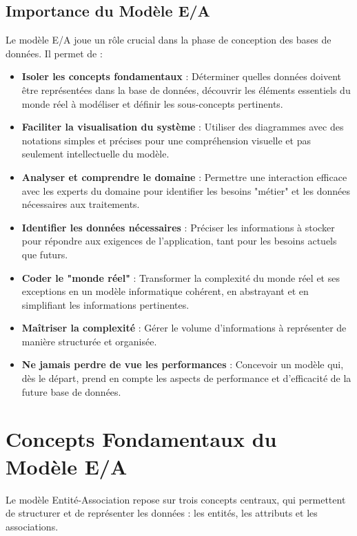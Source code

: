 \documentclass{article}
\begin{document}
\subsection{Importance du Modèle E/A}

Le modèle E/A joue un rôle crucial dans la phase de conception des bases de données. Il permet de :

\begin{itemize}
    \item \textbf{Isoler les concepts fondamentaux} : Déterminer quelles données doivent être représentées dans la base de données, découvrir les éléments essentiels du monde réel à modéliser et définir les sous-concepts pertinents.
    \item \textbf{Faciliter la visualisation du système} : Utiliser des diagrammes avec des notations simples et précises pour une compréhension visuelle et pas seulement intellectuelle du modèle.
    \item \textbf{Analyser et comprendre le domaine} :  Permettre une interaction efficace avec les experts du domaine pour identifier les besoins "métier" et les données nécessaires aux traitements.
    \item \textbf{Identifier les données nécessaires} : Préciser les informations à stocker pour répondre aux exigences de l'application, tant pour les besoins actuels que futurs.
    \item \textbf{Coder le "monde réel"} :  Transformer la complexité du monde réel et ses exceptions en un modèle informatique cohérent, en abstrayant et en simplifiant les informations pertinentes.
    \item \textbf{Maîtriser la complexité} : Gérer le volume d'informations à représenter de manière structurée et organisée.
    \item \textbf{Ne jamais perdre de vue les performances} :  Concevoir un modèle qui, dès le départ, prend en compte les aspects de performance et d'efficacité de la future base de données.
\end{itemize}

\section{Concepts Fondamentaux du Modèle E/A}

Le modèle Entité-Association repose sur trois concepts centraux, qui permettent de structurer et de représenter les données : les entités, les attributs et les associations.
\end{document}
